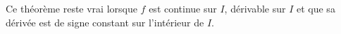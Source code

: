 \documentclass{magnolia}
\begin{document}
\begin{remarqueUnique}
\remarque Ce théorème reste vrai lorsque $f$ est continue sur $I$, dérivable sur $I$
  et que sa dérivée est de signe constant sur l'intérieur de $I$.
\end{remarqueUnique}

\end{document}
